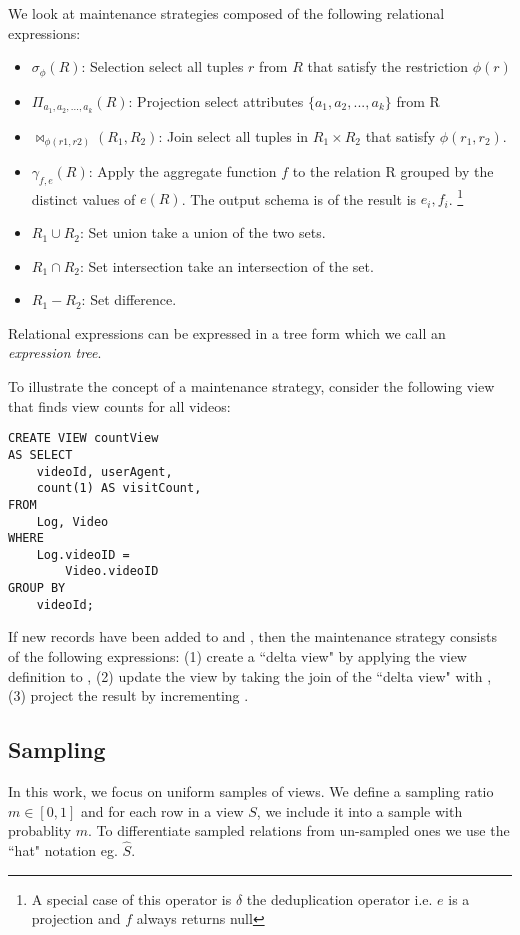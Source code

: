 We look at maintenance strategies composed of the following relational expressions:
\begin{itemize}\vspace{-.45em}
\item $\sigma_{\phi}(R)$: Selection select all tuples $r$ from $R$ that satisfy the restriction $\phi (r)$ \vspace{-.45em}
\item $\Pi_{a_1,a_2,...,a_k}(R)$: Projection select attributes $\{a_1,a_2,...,a_k\}$ from R \vspace{-.45em}
\item $\bowtie_{\phi (r1,r2)}(R_1,R_2)$: Join select all tuples in $R_1 \times R_2$ that satisfy $\phi (r_1,r_2)$.
\item $\gamma_{f,e}(R)$: Apply the aggregate function $f$ to the relation R grouped by the distinct values of $e(R)$. The output schema is of the result is $e_i, f_i$. \footnote{A special case of this operator is $\delta$ the deduplication operator i.e. $e$ is a projection and $f$ always returns null}\vspace{-.45em}
\item $R_1 \cup R_2$: Set union take a union of the two sets.
\item $R_1 \cap R_2$: Set intersection take an intersection of the set.
\item $R_1 - R_2$: Set difference.
\end{itemize}
Relational expressions can be expressed in a tree form which we call an \emph{expression tree}.

To illustrate the concept of a maintenance strategy, consider the following view that finds view counts for all videos:
\begin{lstlisting} 
CREATE VIEW countView
AS SELECT 
	videoId, userAgent,
	count(1) AS visitCount,
FROM 
	Log, Video
WHERE 
	Log.videoID = 
		Video.videoID
GROUP BY 
	videoId;
\end{lstlisting}
If new records have been added to  and , then the maintenance strategy consists of the following expressions: (1) create a ``delta view" by applying the view definition to , (2) update the view by taking the join of the ``delta view" with , (3) project the result by incrementing .

\subsection{Sampling}
In this work, we focus on uniform samples of views.
We define a sampling ratio $m\in [0,1]$ and for each row in a view $S$, we include it into a sample with probablity $m$.
To differentiate sampled relations from un-sampled ones we use the ``hat" notation eg. $\hat{S}$.

